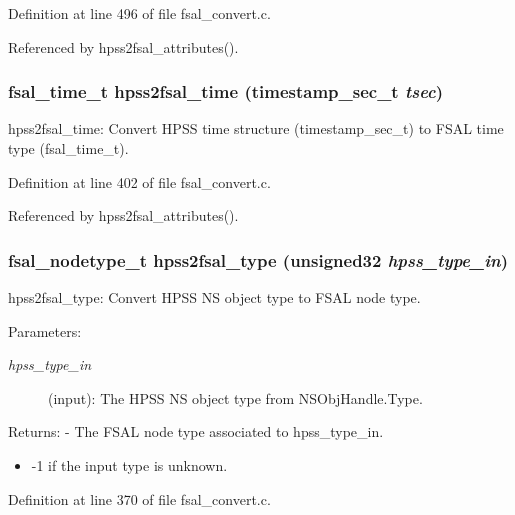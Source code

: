 Definition at line 496 of file fsal\_\-convert.c.

Referenced by hpss2fsal\_\-attributes().
\subsubsection[{hpss2fsal\_\-time}]{\setlength{\rightskip}{0pt plus 5cm}fsal\_\-time\_\-t hpss2fsal\_\-time (timestamp\_\-sec\_\-t {\em tsec})}\label{fsal__convert_8c_300abfc1218fa0f2814a0d6ab513a71c}


hpss2fsal\_\-time: Convert HPSS time structure (timestamp\_\-sec\_\-t) to FSAL time type (fsal\_\-time\_\-t). 

Definition at line 402 of file fsal\_\-convert.c.

Referenced by hpss2fsal\_\-attributes().
\subsubsection[{hpss2fsal\_\-type}]{\setlength{\rightskip}{0pt plus 5cm}fsal\_\-nodetype\_\-t hpss2fsal\_\-type (unsigned32 {\em hpss\_\-type\_\-in})}\label{fsal__convert_8c_111704e087414214b69f8876316c5ca9}


hpss2fsal\_\-type: Convert HPSS NS object type to FSAL node type.

\begin{Desc}
\item[Parameters:]
\begin{description}
\item[{\em hpss\_\-type\_\-in}](input): The HPSS NS object type from NSObjHandle.Type.\end{description}
\end{Desc}
\begin{Desc}
\item[Returns:]- The FSAL node type associated to hpss\_\-type\_\-in.\begin{itemize}
\item -1 if the input type is unknown. \end{itemize}
\end{Desc}


Definition at line 370 of file fsal\_\-convert.c.

